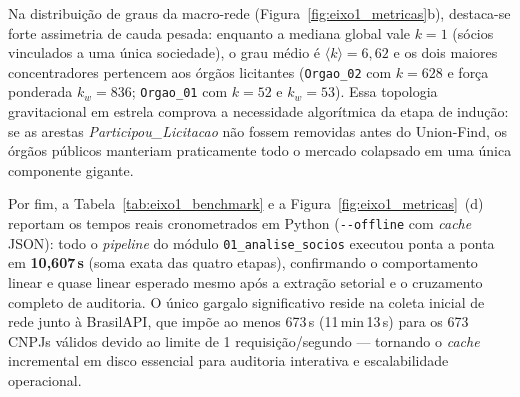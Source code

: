 Na distribuição de graus da macro-rede (Figura~\ref{fig:eixo1_metricas}b), destaca-se forte assimetria de cauda pesada: enquanto a mediana global vale $k=1$ (sócios vinculados a uma única sociedade), o grau médio é $\langle k \rangle = 6{,}62$ e os dois maiores concentradores pertencem aos órgãos licitantes (\texttt{Orgao\_02} com $k=628$ e força ponderada $k_w=836$; \texttt{Orgao\_01} com $k=52$ e $k_w=53$). Essa topologia gravitacional em estrela comprova a necessidade algorítmica da etapa de indução: se as arestas \textit{Participou\_\allowbreak Licitacao} não fossem removidas antes do Union-Find, os órgãos públicos manteriam praticamente todo o mercado colapsado em uma única componente gigante.

Por fim, a Tabela~\ref{tab:eixo1_benchmark} e a Figura~\ref{fig:eixo1_metricas}~(d) reportam os tempos reais cronometrados em Python (\texttt{-{}-offline} com \textit{cache} JSON): todo o \textit{pipeline} do módulo \texttt{01\_\allowbreak analise\_\allowbreak socios} executou ponta a ponta em \textbf{10,607\,s} (soma exata das quatro etapas), confirmando o comportamento linear e quase linear esperado mesmo após a extração setorial e o cruzamento completo de auditoria. O único gargalo significativo reside na coleta inicial de rede junto à BrasilAPI, que impõe ao menos 673\,s (11\,min\,13\,s) para os 673 CNPJs válidos devido ao limite de 1 requisição/segundo — tornando o \textit{cache} incremental em disco essencial para auditoria interativa e escalabilidade operacional.

